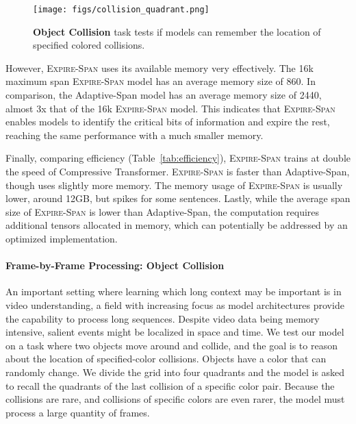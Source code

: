 \begin{figure}[t]
    \centering 
    \texttt{[image: figs/collision\_quadrant.png]}
     \caption{\textbf{Object Collision} task tests if models can remember the location of specified colored collisions.}
    \label{fig:collision}
\end{figure}

However, \textsc{Expire-Span} uses its available memory very effectively. The 16k maximum span \textsc{Expire-Span} model has an average memory size of 860. 
In comparison, the Adaptive-Span model has an average memory size of 2440, almost 3x that of the 16k \textsc{Expire-Span} model. This indicates that \textsc{Expire-Span} enables models to identify the critical bits of information and expire the rest, reaching the same performance with a much smaller memory.

Finally, comparing efficiency (Table~\ref{tab:efficiency}),  \textsc{Expire-Span} trains at double the speed of Compressive Transformer. \textsc{Expire-Span} is faster than Adaptive-Span, though uses slightly more memory. The memory usage of \textsc{Expire-Span} is usually lower, around 12GB, but spikes for some sentences. Lastly, while the average span size of \textsc{Expire-Span} is lower than Adaptive-Span, the computation requires additional tensors allocated in memory, which can potentially be addressed by an optimized implementation. 

\paragraph{Frame-by-Frame Processing: Object Collision} 

An important setting where learning which long context may be important is in video understanding, a field with increasing focus as model architectures provide the capability to process long sequences.  Despite video data being memory intensive, salient events might be localized in space and time.
We test our model on a task where two objects move around and collide, and the goal is to reason about the location of specified-color collisions. Objects have a color that can randomly change. We divide the grid into four quadrants and the model is asked to recall the quadrants of the last collision of a specific color pair. Because the collisions are rare, and collisions of specific colors are even rarer, the model must process a large quantity of frames.  


